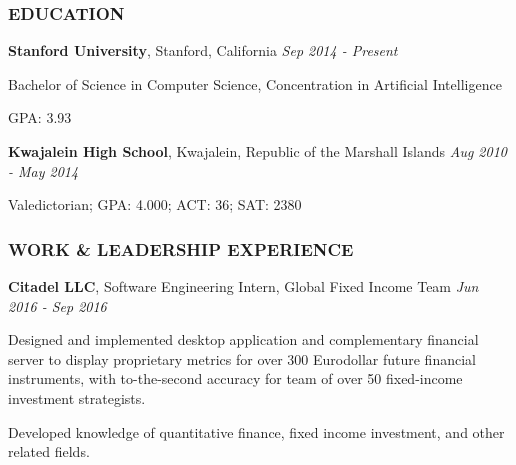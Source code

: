 \documentclass[11pt,letterpaper]{article}%
\begin{document}
\selectfont

\vspace{.5em}
\subsubsection*{EDUCATION}
\vspace{-2ex}
\hrulefill
\small

\hspace{.6em} 
{\bf Stanford University}, Stanford, California \hfill \textit{Sep 2014 - Present}

\hspace{1.2em} 
{Bachelor of Science} in Computer Science, Concentration in Artificial Intelligence 

\hspace{1.2em} 
GPA: 3.93

\hspace{.6em} 
{\bf Kwajalein High School}, Kwajalein, Republic of the Marshall Islands \hfill \textit{Aug 2010 - May 2014}

\hspace{1.2em} 
Valedictorian; GPA: 4.000; ACT: 36; SAT: 2380

\vspace{.4em}
\subsubsection*{WORK \& LEADERSHIP EXPERIENCE}
\vspace{-2ex}
\hrulefill

\vspace{.3em}
\hspace{.6em} 
{\bf Citadel LLC}, Software Engineering Intern, Global Fixed Income Team \hfill \textit{Jun 2016 - Sep 2016}
\vspace{-.4em}
\begin{itemize*}
\item 
Designed and implemented desktop application and complementary financial server  to display proprietary metrics for over 300 Eurodollar future financial instruments, with to-the-second accuracy for team of over 50 fixed-income investment strategists.
\item
Developed knowledge of quantitative finance, fixed income investment, and other related fields.
\end{itemize*}
\end{document}
